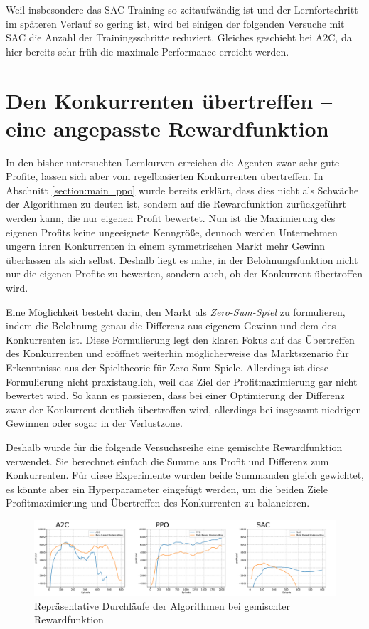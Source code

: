 Weil insbesondere das SAC-Training so zeitaufwändig ist und der Lernfortschritt im späteren Verlauf so gering ist, wird bei einigen der folgenden Versuche mit SAC die Anzahl der Trainingsschritte reduziert.
Gleiches geschieht bei A2C, da hier bereits sehr früh die maximale Performance erreicht werden.

\section{Den Konkurrenten übertreffen -- eine angepasste Rewardfunktion}
\label{section:mixed_reward_function}
In den bisher untersuchten Lernkurven erreichen die Agenten zwar sehr gute Profite, lassen sich aber vom regelbasierten Konkurrenten übertreffen.
In Abschnitt \ref{section:main_ppo} wurde bereits erklärt, dass dies nicht als Schwäche der Algorithmen zu deuten ist, sondern auf die Rewardfunktion zurückgeführt werden kann, die nur eigenen Profit bewertet.
Nun ist die Maximierung des eigenen Profits keine ungeeignete Kenngröße, dennoch werden Unternehmen ungern ihren Konkurrenten in einem symmetrischen Markt mehr Gewinn überlassen als sich selbst.
Deshalb liegt es nahe, in der Belohnungsfunktion nicht nur die eigenen Profite zu bewerten, sondern auch, ob der Konkurrent übertroffen wird.

Eine Möglichkeit besteht darin, den Markt als \textit{Zero-Sum-Spiel} zu formulieren, indem die Belohnung genau die Differenz aus eigenem Gewinn und dem des Konkurrenten ist.
Diese Formulierung legt den klaren Fokus auf das Übertreffen des Konkurrenten und eröffnet weiterhin möglicherweise das Marktszenario für Erkenntnisse aus der Spieltheorie für Zero-Sum-Spiele.
Allerdings ist diese Formulierung nicht praxistauglich, weil das Ziel der Profitmaximierung gar nicht bewertet wird.
So kann es passieren, dass bei einer Optimierung der Differenz zwar der Konkurrent deutlich übertroffen wird, allerdings bei insgesamt niedrigen Gewinnen oder sogar in der Verlustzone.

Deshalb wurde für die folgende Versuchsreihe eine gemischte Rewardfunktion verwendet.
Sie berechnet einfach die Summe aus Profit und Differenz zum Konkurrenten.
Für diese Experimente wurden beide Summanden gleich gewichtet, es könnte aber ein Hyperparameter eingefügt werden, um die beiden Ziele Profitmaximierung und Übertreffen des Konkurrenten zu balancieren.

\begin{figure}[htb]
	\centering
	\includegraphics[width=\textwidth]{main/lineplot_mixed_rewards.pdf}
	\caption{Repräsentative Durchläufe der Algorithmen bei gemischter Rewardfunktion}
	\label{graphic:LineplotMixedRewards}
\end{figure}

